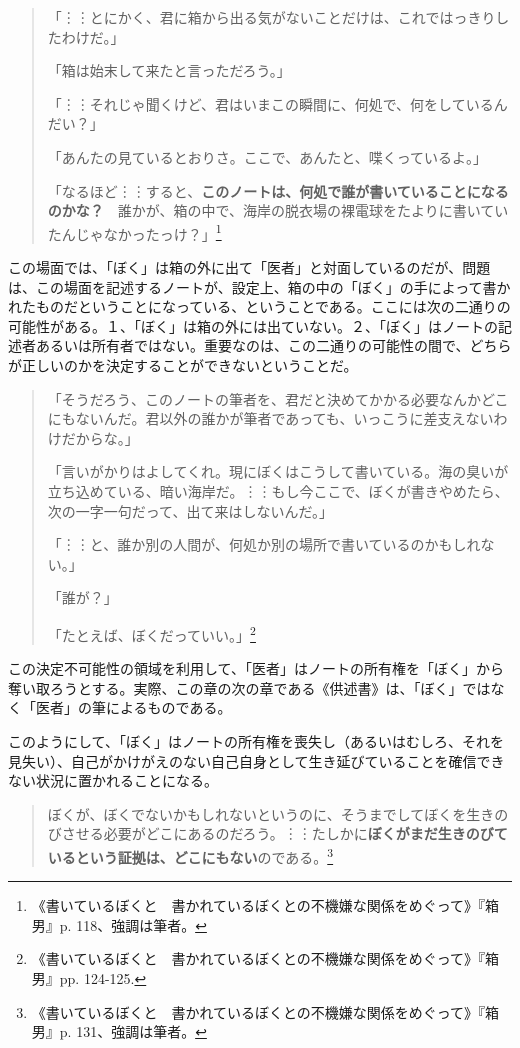 \documentclass[b5j,twoside,twocolumn]{utarticle}
\begin{document}
\begin{quotation}
「︙︙とにかく、君に箱から出る気がないことだけは、これではっきりしたわけだ。」
	
「箱は始末して来たと言っただろう。」
	
「︙︙それじゃ聞くけど、君はいまこの瞬間に、何処で、何をしているんだい？」
	
「あんたの見ているとおりさ。ここで、あんたと、喋くっているよ。」
	
「なるほど︙︙すると、\textbf{このノートは、何処で誰が書いていることになるのかな？}　誰かが、箱の中で、海岸の脱衣場の裸電球をたよりに書いていたんじゃなかったっけ？」\footnote{《書いているぼくと　書かれているぼくとの不機嫌な関係をめぐって》『箱男』p. 118、強調は筆者。}	
\end{quotation}

この場面では、「ぼく」は箱の外に出て「医者」と対面しているのだが、問題は、この場面を記述するノートが、設定上、箱の中の「ぼく」の手によって書かれたものだということになっている、ということである。ここには次の二通りの可能性がある。１、「ぼく」は箱の外には出ていない。２、「ぼく」はノートの記述者あるいは所有者ではない。重要なのは、この二通りの可能性の間で、どちらが正しいのかを決定することができないということだ。

\begin{quotation}
「そうだろう、このノートの筆者を、君だと決めてかかる必要なんかどこにもないんだ。君以外の誰かが筆者であっても、いっこうに差支えないわけだからな。」

「言いがかりはよしてくれ。現にぼくはこうして書いている。海の臭いが立ち込めている、暗い海岸だ。︙︙もし今ここで、ぼくが書きやめたら、次の一字一句だって、出て来はしないんだ。」

「︙︙と、誰か別の人間が、何処か別の場所で書いているのかもしれない。」

「誰が？」

「たとえば、ぼくだっていい。」\footnote{《書いているぼくと　書かれているぼくとの不機嫌な関係をめぐって》『箱男』pp. 124-125.}
\end{quotation}

この決定不可能性の領域を利用して、「医者」はノートの所有権を「ぼく」から奪い取ろうとする。実際、この章の次の章である《供述書》は、「ぼく」ではなく「医者」の筆によるものである。

このようにして、「ぼく」はノートの所有権を喪失し（あるいはむしろ、それを見失い）、自己がかけがえのない自己自身として生き延びていることを確信できない状況に置かれることになる。

\begin{quotation}
ぼくが、ぼくでないかもしれないというのに、そうまでしてぼくを生きのびさせる必要がどこにあるのだろう。︙︙たしかに\textbf{ぼくがまだ生きのびているという証拠は、どこにもない}のである。\footnote{《書いているぼくと　書かれているぼくとの不機嫌な関係をめぐって》『箱男』p. 131、強調は筆者。}
\end{quotation}
\end{document}
